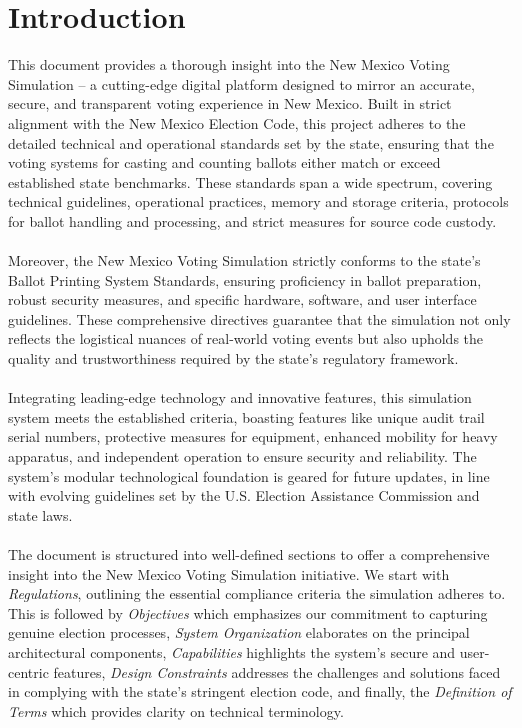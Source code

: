 \documentclass{article}
\begin{document}
\section{Introduction}
This document provides a thorough insight into the New Mexico Voting Simulation – a cutting-edge digital platform designed to mirror an accurate, secure, and transparent voting experience in New Mexico. Built in strict alignment with the New Mexico Election Code, this project adheres to the detailed technical and operational standards set by the state, ensuring that the voting systems for casting and counting ballots either match or exceed established state benchmarks. These standards span a wide spectrum, covering technical guidelines, operational practices, memory and storage criteria, protocols for ballot handling and processing, and strict measures for source code custody. \\ \\
Moreover, the New Mexico Voting Simulation strictly conforms to the state's Ballot Printing System Standards, ensuring proficiency in ballot preparation, robust security measures, and specific hardware, software, and user interface guidelines. These comprehensive directives guarantee that the simulation not only reflects the logistical nuances of real-world voting events but also upholds the quality and trustworthiness required by the state's regulatory framework. \\ \\
Integrating leading-edge technology and innovative features, this simulation system meets the established criteria, boasting features like unique audit trail serial numbers, protective measures for equipment, enhanced mobility for heavy apparatus, and independent operation to ensure security and reliability. The system's modular technological foundation is geared for future updates, in line with evolving guidelines set by the U.S. Election Assistance Commission and state laws. \\ \\
The document is structured into well-defined sections to offer a comprehensive insight into the New Mexico Voting Simulation initiative. We start with \textit{Regulations}, outlining the essential compliance criteria the simulation adheres to. This is followed by \textit{Objectives} which emphasizes our commitment to capturing genuine election processes, \textit{System Organization} elaborates on the principal architectural components, \textit{Capabilities} highlights the system's secure and user-centric features, \textit{Design Constraints} addresses the challenges and solutions faced in complying with the state's stringent election code, and finally, the \textit{Definition of Terms} which provides clarity on technical terminology. \\ \\
\end{document}
